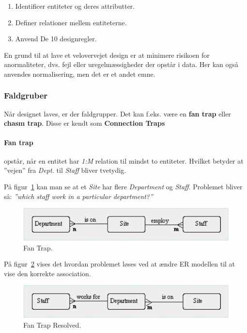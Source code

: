 \begin{enumerate}
	\item Identificer entiteter og deres attributter.
	\item Definer relationer mellem entiteterne.
	\item Anvend De 10 designregler.
\end{enumerate}

En grund til at lave et velovervejet design er at minimere risikoen for anormaliteter, dvs. fejl eller uregelmæssigheder der opstår i data. Her kan også anvendes normalisering, men det er et andet emne.

\subsubsection{Faldgruber}
Når designet laves, er der faldgrupper. Det kan f.eks. være en \textbf{fan trap} eller \textbf{chasm trap}. Disse er kendt som \textbf{Connection Traps} 

\paragraph{Fan trap} opstår, når en entitet har \textit{1:M} relation til mindst to entiteter. Hvilket betyder at ''vejen'' fra \textit{Dept.} til \textit{Staff} bliver tvetydig. 

På figur~\ref{fig:fan} kan man se at et \textit{Site} har flere \textit{Department} og \textit{Staff}. Problemet bliver så: \textit{''which staff work in a particular department?''}

\begin{figure}[h]
\centering
\includegraphics[width=0.8\linewidth]{figs/spm2/fan}
\caption{Fan Trap.}
\label{fig:fan}
\end{figure}

På figur~\ref{fig:fan_solved} vises det hvordan problemet løses ved at ændre ER modellen til at vise den korrekte association.

\begin{figure}[h]
\centering
\includegraphics[width=0.8\linewidth]{figs/spm2/fan_solved}
\caption{Fan Trap Resolved.}
\label{fig:fan_solved}
\end{figure}

